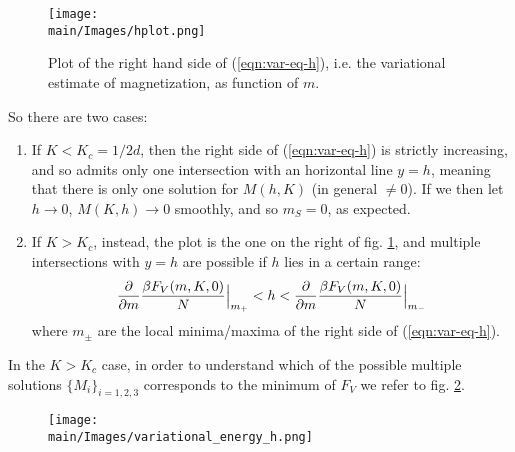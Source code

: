 \documentclass[../../main.tex]{subfiles}
\begin{document}
\begin{figure}[H]
    \centering
    \texttt{[image: \\main/Images/hplot.png]}
    \caption{Plot of the right hand side of (\ref{eqn:var-eq-h}), i.e. the variational estimate of magnetization,
as function of $m$.}
    \label{fig:hplot}
\end{figure}

So there are two cases:
\begin{enumerate}
    \item If $K < K_c = 1/2d$, then the right side of (\ref{eqn:var-eq-h}) is strictly increasing, and so admits only one intersection with an horizontal line $y = h$, meaning that there is only one solution for $M(h,K)$ (in general $\neq 0$). If we then let $h \to 0$, $M(K,h) \to 0$ smoothly, and so $m_S = 0$, as expected. 
    \item If $K > K_c$, instead, the plot is the one on the right of fig. \ref{fig:hplot}, and multiple intersections with $y=h$ are possible if $h$ lies in a certain range:
    \begin{align*}
        \pdv{m} \frac{\beta F_V(m,K,0)}{N} \Big|_
        {m_+} < h < \pdv{m} \frac{\beta F_V(m,K,0) }{N}\Big|_{m_-}
    \end{align*}
    where $m_\pm$ are the local minima/maxima of the right side of (\ref{eqn:var-eq-h}).
\end{enumerate}

In the $K>K_c$ case, in order to understand which of the possible multiple solutions $\{M_i\}_{i=1,2,3}$ corresponds to the minimum of $F_V$ we refer to fig. \ref{fig:variational_energy_h}.

\begin{figure}[H]
    \centering
    \texttt{[image: \\main/Images/variational\_energy\_h.png]}
    \caption{} %
    \label{fig:variational_energy_h}
\end{figure}
\end{document}
